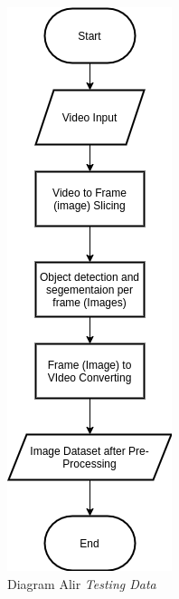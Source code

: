 \begin{figure}[ht]
	\centering
	\includegraphics[scale=0.4]{gambar/testing.png}
	\caption{Diagram Alir \textit{Testing Data}}
	\label{fig:testing}
\end{figure} 
%
%
%
%
%
%
%
